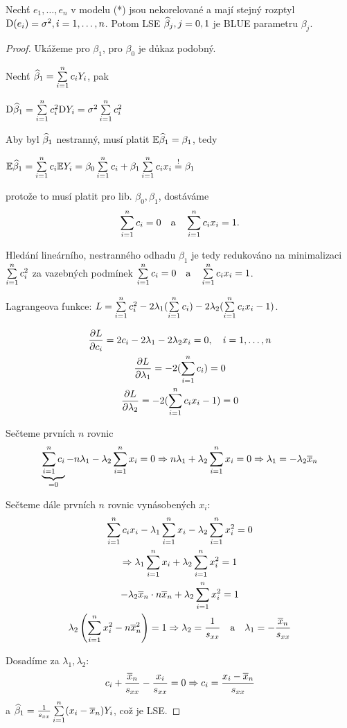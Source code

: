 \begin{theorem}
	Nechť $e_1, \dots, e_n$ v modelu (*) jsou nekorelované a mají stejný rozptyl $\mathrm{D}(e_i) = \sigma^2, i = 1, \dots, n$. Potom LSE $\widehat{\beta}_j, j = 0,1$ je BLUE parametru $\beta_j$.
\end{theorem}

\newcommand{\pd}{\delta}

\begin{proof}
	Ukážeme pro $\beta_1$, pro $\beta_0$ je důkaz podobný.
	
	Nechť $\widehat{\beta}_1 = \sum\limits_{i=1}^{n} c_i Y_i$, pak
	
	$\mathrm{D} \widehat{\beta}_1 = \sum\limits_{i=1}^{n} c_i^2 \mathrm{D} Y_i = \sigma^2 \sum\limits_{i=1}^{n} c_i^2$
	
	Aby byl $\widehat{\beta}_1$ nestranný, musí platit $\mathbb{E} \widehat{\beta}_1 = \beta_1$, tedy
	
	$\mathbb{E} \widehat{\beta}_1 = \sum\limits_{i=1}^{n} c_i \mathbb{E} Y_i = \beta_0 \sum\limits_{i=1}^{n} c_i + \beta_1 \sum\limits_{i=1}^{n} c_i x_i \overset{!}{=} \beta_1$
	
	protože to musí platit pro lib. $\beta_0, \beta_1$, dostáváme
	$$
		\sum\limits_{i=1}^{n} c_i = 0 \quad \text{a} \quad \sum\limits_{i=1}^{n} c_i x_i = 1.
	$$
	
	Hledání lineárního, nestranného odhadu $\beta_1$ je tedy redukováno na minimalizaci $\sum\limits_{i=1}^{n} c_i^2$ za vazebných podmínek $\sum\limits_{i=1}^{n} c_i = 0 \quad \text{a} \quad \sum\limits_{i=1}^{n} c_i x_i = 1$.
	
	Lagrangeova funkce: $L = \sum\limits_{i=1}^{n} c_i^2 - 2 \lambda_1 (\sum\limits_{i=1}^{n} c_i) - 2 \lambda_2 (\sum\limits_{i=1}^{n} c_i x_i - 1)$.
	
	\begin{gather*}
		\frac{\partial L}{\partial c_i} = 2 c_i - 2 \lambda_1 - 2 \lambda_2 x_i = 0, \quad i = 1, \dots, n \\
		\frac{\partial L}{\partial \lambda_1} = -2 (\sum\limits_{i=1}^{n} c_i) = 0 \\
		\frac{\partial L}{\partial \lambda_2} = -2 (\sum\limits_{i=1}^{n} c_i x_i - 1) = 0
	\end{gather*}
	
	Sečteme prvních $n$ rovnic
	$$
		\underbrace{\sum\limits_{i=1}^{n} c_i}_{= 0} - n \lambda_1 - \lambda_2 \sum\limits_{i=1}^{n} x_i = 0 \Rightarrow n\lambda_1 + \lambda_2 \sum\limits_{i=1}^{n} x_i = 0 \Rightarrow \lambda_1 = - \lambda_2 \overline{x}_n
	$$
	
	Sečteme dále prvních $n$ rovnic vynásobených $x_i$:
	\begin{gather*}
		\sum\limits_{i=1}^{n} c_i x_i - \lambda_1 \sum\limits_{i=1}^{n} x_i - \lambda_2 \sum\limits_{i=1}^{n} x_i^2 = 0 \\
		\Rightarrow \lambda_1 \sum\limits_{i=1}^{n} x_i + \lambda_2 \sum\limits_{i=1}^{n} x_i^2 = 1 \\
		 -\lambda_2 \overline{x}_n \cdot n \overline{x}_n + \lambda_2 \sum\limits_{i=1}^{n} x_i^2 = 1 \\
		 \lambda_2 \left( \sum\limits_{i=1}^{n} x_i^2 - n \overline{x}_n^2 \right) = 1 \Rightarrow \lambda_2 = \frac{1}{s_{xx}} \quad \text{a} \quad \lambda_1 = - \frac{\overline{x}_n}{s_{xx}}
	\end{gather*}
	
	Dosadíme za $\lambda_1, \lambda_2$:
	$$
		c_i + \frac{\overline{x}_n}{s_{xx}} - \frac{x_i}{s_{xx}} = 0 \Rightarrow c_i = \frac{x_i - \overline{x}_n}{s_{xx}}
	$$
	a $\widehat{\beta}_1 = \frac{1}{s_{xx}} \sum\limits_{i=1}^{n} (x_i - \overline{x}_n) Y_i$, což je LSE.

\end{proof}

